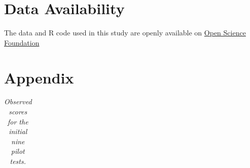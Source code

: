 \documentclass[empirical,issue, twocolumn,authordate]{jote-new-article}
\begin{document}
\section{Data Availability}

The data and R code used in this study are openly available on \href{https://osf.io/d9mfn/?view\_only=6b9bd4580dbf42b4952e551972f48c68}{Open Science Foundation}  




\printbibliography

 \onecolumn
\n
\section{Appendix}


\begin{table}[t!]

  \caption{\emph{Observed scores for the initial nine pilot tests.}}
\label{tab:table2}
\begin{tabular}{c  c  c  c  c  c  c  c  c  c  c  c  c  c  c  c  c  c}
\toprule


\end{tabular}
\end{table}
\end{document}
